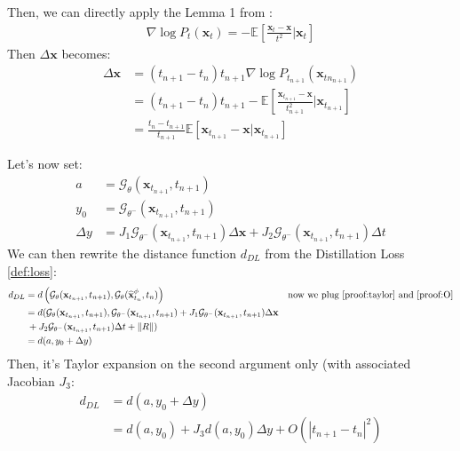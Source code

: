 \noindent Then, we can directly apply the Lemma 1 from \cite{song2023consistencymodels}:
\begin{align}
    \nabla \log P_t(\mathbf{x}_t) = - \mathbb{E} \left[\frac{\mathbf{x}_t - \mathbf{x}}{t^2} | \mathbf{x}_t \right]
\end{align}
\noindent Then $\Delta \mathbf{x}$ becomes:
\begin{align}
    \Delta \mathbf{x} & = (t_{n+1} - t_n)t_{n+1}\nabla \log P_{t_{n+1}}(\mathbf{x}_{tn_{n+1}}) \\
    & = (t_{n+1} - t_n)t_{n+1} - \mathbb{E} \left[\frac{\mathbf{x}_{t_{n +1}} - \mathbf{x}}{t_{n+1}^2} | \mathbf{x}_{t_{n+1}} \right] \\
    & = \frac{t_n - t_{n+1} }{t_{n+1}}\mathbb{E} \left[\mathbf{x}_{t_{n +1}} - \mathbf{x}| \mathbf{x}_{t_{n+1}} \right] \label{proof:deltaX}
\end{align}

\noindent Let's now set:
\begin{align}
    a & = \mathcal{G}_{\theta}(\mathbf{x}_{t_{n+1}}, t_{n+1}) \\
    y_0 & = \mathcal{G}_{\theta^-}(\mathbf{x}_{t_{n+1}}, t_{n+1}) \\
    \Delta y &= J_1\mathcal{G}_{\theta^-}(\mathbf{x}_{t_{n+1}}, t_{n+1})\Delta \mathbf{x} + J_2\mathcal{G}_{\theta^-}(\mathbf{x}_{t_{n+1}}, t_{n+1})\Delta t
\end{align}
We can then rewrite the distance function $d_{DL}$ from the Distillation Loss \ref{def:loss}:
\begin{align}
    d_{DL} & = d \left(\mathcal{G}_{\theta}(\mathbf{x}_{t_{n+1}}, t_{n+1}), \mathcal{G}_{\theta}(\widehat{\mathbf{x}}_{t_{n}}^{\phi}, t_{n}) \right) & \text{now we plug \ref{proof:taylor} and \ref{proof:O}} \\
    & = d (\mathcal{G}_{\theta}(\mathbf{x}_{t_{n+1}}, t_{n+1}), \mathcal{G}_{\theta^-}(\mathbf{x}_{t_{n+1}}, t_{n+1}) +  J_1\mathcal{G}_{\theta^-}(\mathbf{x}_{t_{n+1}}, t_{n+1})\Delta \mathbf{x}  \\
    & \: + J_2\mathcal{G}_{\theta^-}(\mathbf{x}_{t_{n+1}}, t_{n+1})\Delta t + \lVert R \rVert ) \\
    & = d(a ,y_0 + \Delta y)
\end{align}
\noindent Then, it's Taylor expansion on the second argument only (with associated Jacobian $J_3$:
\begin{align}
    d_{DL} & = d(a, y_0 + \Delta y) \\
           & = d(a, y_0) + J_3 d(a, y_0) \Delta y + O(|t_{n+1} - t_n |^2)
\end{align}

